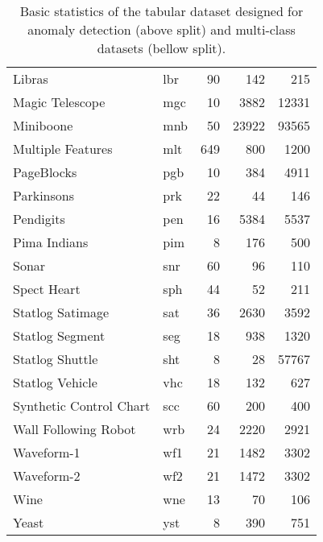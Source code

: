 \begin{table}
\begin{tabular}{llrrr}
Libras & lbr & 90 & 142 & 215  \\
Magic Telescope & mgc & 10 & 3882 & 12331  \\
Miniboone & mnb & 50 & 23922 & 93565  \\
Multiple Features & mlt & 649 & 800 & 1200  \\
PageBlocks & pgb & 10 & 384 & 4911  \\
Parkinsons & prk & 22 & 44 & 146  \\
Pendigits & pen & 16 & 5384 & 5537  \\
Pima Indians & pim & 8 & 176 & 500  \\
Sonar & snr & 60 & 96 & 110  \\
Spect Heart & sph & 44 & 52 & 211  \\
Statlog Satimage & sat & 36 & 2630 & 3592  \\
Statlog Segment & seg & 18 & 938 & 1320  \\
Statlog Shuttle & sht & 8 & 28 & 57767  \\
Statlog Vehicle & vhc & 18 & 132 & 627  \\
Synthetic Control Chart & scc & 60 & 200 & 400  \\
Wall Following Robot & wrb & 24 & 2220 & 2921  \\
Waveform-1 & wf1 & 21 & 1482 & 3302  \\
Waveform-2 & wf2 & 21 & 1472 & 3302  \\
Wine & wne & 13 & 70 & 106  \\
Yeast & yst & 8 & 390 & 751   \\\bottomrule
\end{tabular}
\vspace*{0.15cm}
\caption{Basic statistics of the tabular dataset designed for anomaly detection  (above split) and multi-class datasets  (bellow split).}
\label{tab:tabular_datasets}
\end{table}


